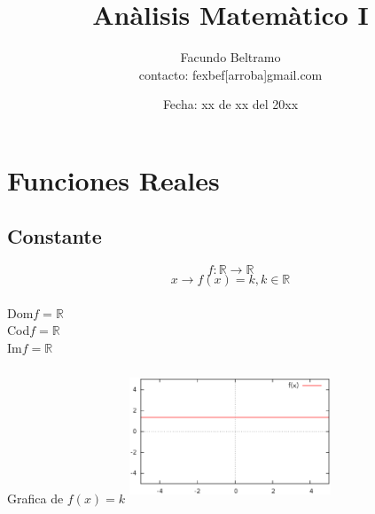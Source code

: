 \documentclass[a4paper,10pt,oneside,onecolumn]{book}
\title{Anàlisis Matemàtico I}
\author{
Facundo Beltramo\\
contacto: fexbef[arroba]gmail.com
}
\date{Fecha: xx de xx del 20xx}
\begin{document}
\maketitle
\tableofcontents %

\chapter{Funciones Reales}\label{cap.Funcines}

\section{Constante}

\hfill
\begin{minipage}{.45\textwidth}

$$f:\mathbb{R} \longrightarrow \mathbb{R}$$
$$x \longrightarrow f(x)= k, k \in \mathbb{R}$$\\
Dom$f = \mathbb{R}$\\
Cod$f = \mathbb{R}$\\
Im$f = \mathbb{R}$\\

\end{minipage}
\hfill
\begin{minipage}{.45\textwidth}
\begin{center}
Grafica de $f(x)= k$
\includegraphics[height=4cm,width=6cm]{fconst.eps} 
\end{center}
\end{minipage}
\hfill
\end{document}
